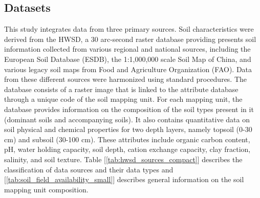 \subsection{Datasets}
This study integrates data from three primary sources. Soil characteristics were derived from the HWSD, a 30 arc-second raster database providing presents soil information collected from various regional and national sources, including the European Soil Database (ESDB), the 1:1,000,000 scale Soil Map of China, and various legacy soil maps from Food and Agriculture Organization (FAO). Data from these different sources were harmonized using standard procedures. The database consists of a raster image that is linked to the attribute database through a unique code of the soil mapping unit. For each mapping unit, the database provides information on the composition of the soil types present in it (dominant soils and accompanying soils). It also contains quantitative data on soil physical and chemical properties for two depth layers, namely topsoil (0-30 cm) and subsoil (30-100 cm). These attributes include organic carbon content, pH, water holding capacity, soil depth, cation exchange capacity, clay fraction, salinity, and soil texture. Table [\ref{tab:hwsd_sources_compact}] describes the classification of data sources and their data types and [\ref{tab:soil_field_availability_small}] describes general information on the soil mapping unit composition.

